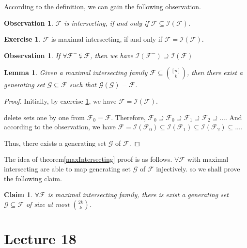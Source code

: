 \documentclass{article}
\newtheorem{lemma}[theorem]{Lemma}
\newtheorem{claim}[theorem]{Claim}
\newtheorem{observation}[theorem]{Observation}
\theoremstyle{definition}
\newtheorem{exercise}[theorem]{Exercise}
\begin{document}
According to the definition, we can gain the following observation. 

\begin{observation}
    $\mathcal{F}$ is intersecting, if and only if $\mathcal{F}\subseteq \mathcal{I}(\mathcal{F})$.
\end{observation}

\begin{exercise}\label{exer}
    $\mathcal{F}$ is maximal intersecting, if and only if $\mathcal{F}=\mathcal{I}(\mathcal{F})$.
\end{exercise}

\begin{observation}
    If $\forall \mathcal{F^{-}} \subsetneqq \mathcal{F}$, then we have $\mathcal{I}(\mathcal{F}^-)\supseteq \mathcal{I}(\mathcal{F})$ 
\end{observation}

\begin{lemma}
    Given a maximal intersecting family $\mathcal{F}\subseteq \binom{[n]}{k}$, then there exist a generating set $\mathcal{G}\subseteq \mathcal{F}$ such that $\mathcal{G}(\mathcal{G})=\mathcal{F}$.
\end{lemma}
\begin{proof}
    Initially, by exercise \ref{exer}, we have $\mathcal{F} =\mathcal{I}(\mathcal{F})$.

    delete sets one by one from $\mathcal{F}_0=\mathcal{F}$. Therefore, $\mathcal{F}_0\supseteq \mathcal{F}_0\supseteq\mathcal{F}_1\supseteq\mathcal{F}_2\supseteq...$. And according to the observation, we have $\mathcal{F}=\mathcal{I}(\mathcal{F}_0)\subseteq\mathcal{I}(\mathcal{F}_1)\subseteq\mathcal{I}(\mathcal{F}_2)\subseteq ...$. 

    Thus, there exists a generating set $\mathcal{G}$ of $\mathcal{F}$.
\end{proof}

The idea of theorem\ref{maxIntersecting} proof is as follows.
$\forall \mathcal{F}$ with maximal intersecting are able to map generating set $\mathcal{G}$ of $\mathcal{F}$ injectively. so we shall prove the following claim.
\begin{claim}
    $\forall \mathcal{F}$ is maximal intersecting family, there is exist a generating set $\mathcal{G}\subseteq \mathcal{F}$ of size at most $\binom{2k}{k}$.
\end{claim}

\newpage
\section{Lecture 18}
\end{document}
